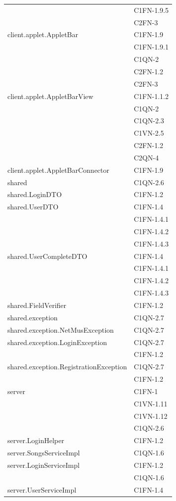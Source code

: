 \begin{footnotesize}
\begin{longtable}[!h]{|l|l|}
& C1FN-1.9.5\\
& C2FN-3\\\hline 
client.applet.AppletBar  &  C1FN-1.9\\
& C1FN-1.9.1\\
& C1QN-2\\
& C2FN-1.2\\
& C2FN-3\\\hline 
client.applet.AppletBarView  &  C1FN-1.1.2\\
& C1QN-2\\
& C1QN-2.3\\
& C1VN-2.5\\
& C2FN-1.2\\
& C2QN-4\\\hline 
client.applet.AppletBarConnector  &  C1FN-1.9  \\\hline 
shared  &  C1QN-2.6 \\\hline 
shared.LoginDTO  &  C1FN-1.2 \\\hline 
shared.UserDTO  & C1FN-1.4\\
& C1FN-1.4.1\\
& C1FN-1.4.2\\
& C1FN-1.4.3\\\hline  
shared.UserCompleteDTO  & C1FN-1.4\\
& C1FN-1.4.1\\
& C1FN-1.4.2\\
& C1FN-1.4.3\\\hline 
shared.FieldVerifier  & C1FN-1.2 \\\hline 
shared.exception  &  C1QN-2.7 \\\hline 
shared.exception.NetMusException  &  C1QN-2.7 \\\hline 
shared.exception.LoginException  &  C1QN-2.7\\
& C1FN-1.2 \\\hline 
shared.exception.RegistrationException  &  C1QN-2.7\\ 
& C1FN-1.2\\\hline 
server  &  C1FN-1\\
& C1VN-1.11\\
& C1VN-1.12\\
& C1QN-2.6\\\hline  
server.LoginHelper  &  C1FN-1.2\\\hline 
server.SongsServiceImpl  &  C1QN-1.6\\\hline 
server.LoginServiceImpl  &  C1FN-1.2\\
& C1QN-1.6\\\hline 
server.UserServiceImpl  &  C1FN-1.4\\

\end{longtable}
\end{footnotesize}
